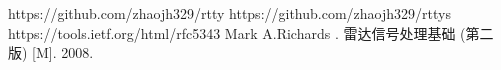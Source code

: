 \documentclass[a4paper,12pt]{report}
\begin{document}

\begin{thebibliography}{99}
\songti {} 	
    https://github.com/zhaojh329/rtty
    https://github.com/zhaojh329/rttys
    https://tools.ietf.org/html/rfc5343
    Mark A.Richards . 雷达信号处理基础 (第二版) [M]. 2008.
    
	
\end{thebibliography}
\end{document}
